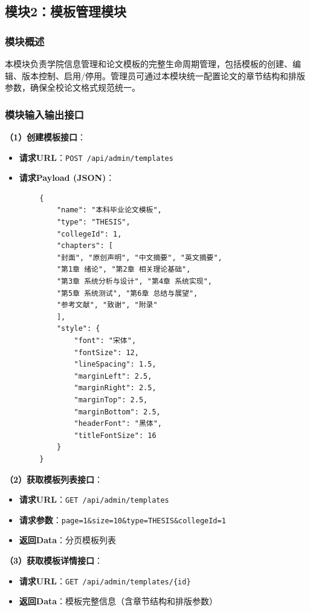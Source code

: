 \documentclass{../template/softeng}
\begin{document}
	\subsection{模块2：模板管理模块}

	\subsubsection{模块概述}
	本模块负责学院信息管理和论文模板的完整生命周期管理，包括模板的创建、编辑、版本控制、启用/停用。管理员可通过本模块统一配置论文的章节结构和排版参数，确保全校论文格式规范统一。

	\subsubsection{模块输入输出接口}

	\textbf{（1）创建模板接口}：
	\begin{itemize}
		\item \textbf{请求URL}：\texttt{POST /api/admin/templates}
		\item \textbf{请求Payload (JSON)}：
	\end{itemize}
	\begin{verbatim}
		{
			"name": "本科毕业论文模板",
			"type": "THESIS",
			"collegeId": 1,
			"chapters": [
			"封面", "原创声明", "中文摘要", "英文摘要",
			"第1章 绪论", "第2章 相关理论基础",
			"第3章 系统分析与设计", "第4章 系统实现",
			"第5章 系统测试", "第6章 总结与展望",
			"参考文献", "致谢", "附录"
			],
			"style": {
				"font": "宋体",
				"fontSize": 12,
				"lineSpacing": 1.5,
				"marginLeft": 2.5,
				"marginRight": 2.5,
				"marginTop": 2.5,
				"marginBottom": 2.5,
				"headerFont": "黑体",
				"titleFontSize": 16
			}
		}
	\end{verbatim}

	\textbf{（2）获取模板列表接口}：
	\begin{itemize}
		\item \textbf{请求URL}：\texttt{GET /api/admin/templates}
		\item \textbf{请求参数}：\texttt{page=1\&size=10\&type=THESIS\&collegeId=1}
		\item \textbf{返回Data}：分页模板列表
	\end{itemize}

	\textbf{（3）获取模板详情接口}：
	\begin{itemize}
		\item \textbf{请求URL}：\texttt{GET /api/admin/templates/\{id\}}
		\item \textbf{返回Data}：模板完整信息（含章节结构和排版参数）
	\end{itemize}
\end{document}
